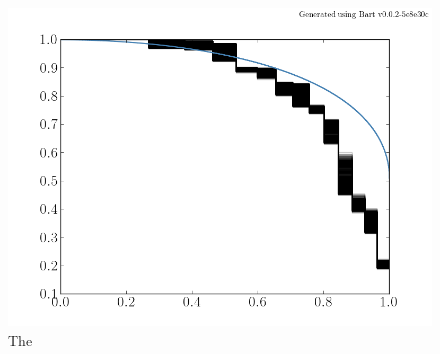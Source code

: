 \documentclass[12pt,preprint]{aastex}
\newcommand{\figlabel}[1]{\label{fig:#1}}
\begin{document}
\begin{figure}[htbp]
    \begin{center}
        \includegraphics[width=\textwidth]{figures/kepler6/ldp.png}
    \end{center}
    \caption{The \figlabel{kep6-ldp}}
\end{figure}
\end{document}
